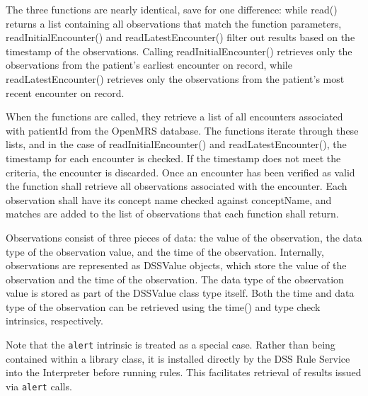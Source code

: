 \documentclass[12pt,letterpaper]{article}
\begin{document}
{The three functions are nearly identical, save for one difference: while read() returns a list containing all observations that match the function parameters, readInitialEncounter() and readLatestEncounter() filter out results based on the timestamp of the observations. Calling readInitialEncounter() retrieves only the observations from the patient's earliest encounter on record, while readLatestEncounter() retrieves only the observations from the patient's most recent encounter on record. 

When the functions are called, they retrieve a list of all encounters associated with patientId from the OpenMRS database. The functions iterate through these lists, and in the case of readInitialEncounter() and readLatestEncounter(), the timestamp for each encounter is checked. If the timestamp does not meet the criteria, the encounter is discarded. Once an encounter has been verified as valid the function shall retrieve all observations associated with the encounter. Each observation shall have its concept name checked against conceptName, and matches are added to the list of observations that each function shall return. 

Observations consist of three pieces of data: the value of the observation, the data type of the observation value, and the time of the observation. Internally, observations are represented as DSSValue objects, which store the value of the observation and the time of the observation. The data type of the observation value is stored as part of the DSSValue class type itself. Both the time and data type of the observation can be retrieved using the time() and type check intrinsics, respectively. 

Note that the \texttt{alert} intrinsic is treated as a special case. Rather than being contained within a library class, it is installed directly by the DSS Rule Service into the Interpreter before running rules. This facilitates retrieval of results issued via \texttt{alert} calls.

}
\end{document}
